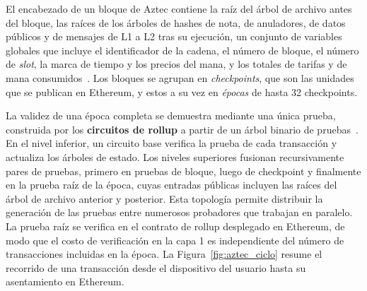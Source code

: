 El encabezado de un bloque de Aztec contiene la raíz del árbol de archivo antes del bloque, las
raíces de los árboles de hashes de nota, de anuladores, de datos públicos y de mensajes de L1 a
L2 tras su ejecución, un conjunto de variables globales que incluye el identificador de la
cadena, el número de bloque, el número de \textit{slot}, la marca de tiempo y los precios del
mana, y los totales de tarifas y de mana consumidos~\cite{aztecconstants}. Los bloques se agrupan
en \textit{checkpoints}, que son las unidades que se publican en Ethereum, y estos a su vez en
\textit{épocas} de hasta 32 checkpoints.

La validez de una época completa se demuestra mediante una única prueba, construida por los
\textbf{circuitos de rollup} a partir de un árbol binario de pruebas~\cite{aztecrollupcircuits}.
En el nivel inferior, un circuito base verifica la prueba de cada transacción y actualiza los
árboles de estado. Los niveles superiores fusionan recursivamente pares de pruebas, primero en
pruebas de bloque, luego de checkpoint y finalmente en la prueba raíz de la época, cuyas entradas
públicas incluyen las raíces del árbol de archivo anterior y posterior. Esta topología permite
distribuir la generación de las pruebas entre numerosos probadores que trabajan en paralelo. La
prueba raíz se verifica en el contrato de rollup desplegado en Ethereum, de modo que el costo de
verificación en la capa 1 es independiente del número de transacciones incluidas en la época. La
Figura~\ref{fig:aztec_ciclo} resume el recorrido de una transacción desde el dispositivo del
usuario hasta su asentamiento en Ethereum.

